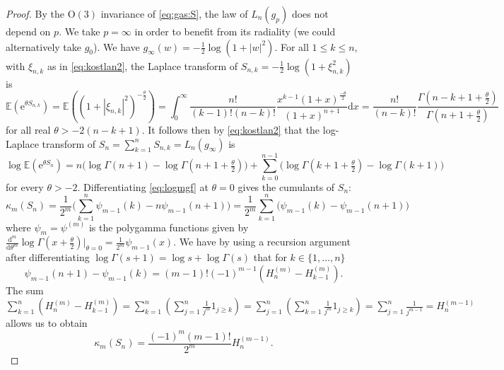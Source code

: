 \documentclass[10pt,reqno]{amsart}
\numberwithin{equation}{section}
\numberwithin{figure}{section}
\theoremstyle{plain}
\newcommand{\<}{\langle}
\renewcommand{\>}{\rangle}
\begin{document}
\begin{proof}
  By the $\mathrm{O}(3)$ invariance of \eqref{eq:gas:S}, the law of
  $L_n(g_p)$ does not depend on $p$. We take $p=\infty$ in order to benefit from its radiality (we could alternatively take $g_0$). We have
  $g_\infty(w)=-\frac{1}{2}\log(1+|w|^2)$. For all $1\leq k\leq n$, with
  $\xi_{n,k}$ as in \eqref{eq:kostlan2}, the Laplace transform of
  $S_{n,k}=-\frac{1}{2}\log(1+\xi_{n,k}^2)$ is 
  \begin{equation}\label{eq:lap_uinf_wnk}
    \mathbb{E}(\mathrm{e}^{\theta S_{n,k}})
    =\mathbb{E}((1+|\xi_{n,k}|^2)^{-\frac{\theta}{2}})
    =\int_0^\infty\frac{n!}{(k-1)!(n-k)!}\frac{x^{k-1}(1+x)^{\frac{-\theta}{2}}}{(1+x)^{n+1}}\mathrm{d}x
    =\frac{n!}{(n-k)!}\frac{\Gamma(n-k+1+\frac{\theta}{2})}{\Gamma(n+1+\frac{\theta}{2})}
  \end{equation}
  for all real $\theta>-2(n-k+1)$. It follows then by \eqref{eq:kostlan2} that
  the log-Laplace transform of $S_n=\sum_{k=1}^nS_{n,k}=L_n(g_\infty)$ is
  \begin{equation}\label{eq:logmgf}
    \log\mathbb{E}(\mathrm{e}^{\theta S_n})
    =n\bigl(\log\Gamma(n+1)-\log\Gamma(n+1+\tfrac{\theta}{2})\bigr)
    +\sum_{k=0}^{n-1}\bigl(\log\Gamma(k+1+\tfrac{\theta}{2})-\log\Gamma(k+1)\bigr)
  \end{equation}
  for every $\theta > -2$. Differentiating
  \eqref{eq:logmgf} at $\theta=0$ gives the cumulants of $S_n$:
  \begin{equation}\label{eq:cum-psi}
    \kappa_m(S_n)
    =
      \frac{1}{2^m}\big(\sum_{k=1}^n \psi_{m-1}(k)-n\psi_{m-1}(n+1)\big)
    =\frac{1}{2^m}\sum_{k=1}^n \big(\psi_{m-1}(k)-
    \psi_{m-1}(n+1) \big)  
  \end{equation}
  where $\psi_m=\psi^{(m)}$ is the polygamma
  functions given by
  $\frac{\mathrm{d}^m}{\mathrm{d}\theta^m}\log\Gamma(x+\tfrac{\theta}{2})\big|_{\theta=0}=\frac{1}{2^m}\psi_{m-1}(x)$.
  We have by using a recursion argument after
  differentiating $\log \Gamma(s+1) = \log s + \log \Gamma(s)$ that for
  $k \in \{1,\dots,n\}$
  \[\psi_{m-1}(n+1) - \psi_{m-1}(k)
  = (m-1)!(-1)^{m-1}(H_n^{(m)} - H_{k-1}^{(m)}).\]
  The sum
    $\sum_{k=1}^n (H_n^{(m)} - H_{k-1}^{(m)})
  =\sum_{k=1}^n (\sum_{j=1}^n \frac{1}{j^m} 1_{j \geq k})
  =\sum_{j=1}^n (\sum_{k=1}^n \frac{1}{j^m} 1_{j \geq k})
  =\sum_{j=1}^n \frac{1}{j^{m-1}} = H_n^{(m-1)}$ 
  allows us to obtain
   \begin{equation}\label{eq:kappa-harmonic}
    \kappa_m(S_n) = \frac{(-1)^m (m-1)!}{2^m}H_{n}^{(m-1)}.
  \end{equation}
  
\end{proof}
\end{document}
